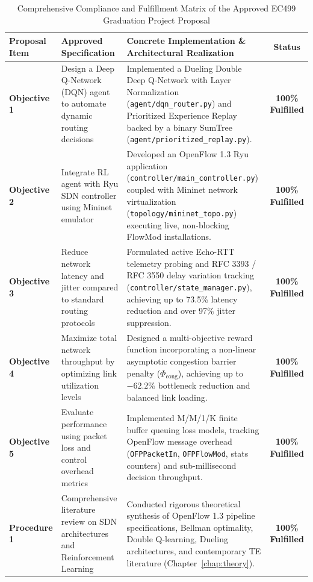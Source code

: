 \begin{table}[htbp]
\centering
\caption{Comprehensive Compliance and Fulfillment Matrix of the Approved EC499 Graduation Project Proposal}
\label{tab:proposal_compliance_ch1}
\scriptsize
\begin{tabularx}{\textwidth}{l p{4.0cm} X c}
\toprule
\textbf{Proposal Item} & \textbf{Approved Specification} & \textbf{Concrete Implementation \& Architectural Realization} & \textbf{Status} \\
\midrule
\textbf{Objective 1} & Design a Deep Q-Network (DQN) agent to automate dynamic routing decisions & Implemented a Dueling Double Deep Q-Network with Layer Normalization (\texttt{agent/dqn\_router.py}) and Prioritized Experience Replay backed by a binary SumTree (\texttt{agent/prioritized\_replay.py}). & \textbf{100\% Fulfilled} \\
\addlinespace
\textbf{Objective 2} & Integrate RL agent with Ryu SDN controller using Mininet emulator & Developed an OpenFlow 1.3 Ryu application (\texttt{controller/main\_controller.py}) coupled with Mininet network virtualization (\texttt{topology/mininet\_topo.py}) executing live, non-blocking FlowMod installations. & \textbf{100\% Fulfilled} \\
\addlinespace
\textbf{Objective 3} & Reduce network latency and jitter compared to standard routing protocols & Formulated active Echo-RTT telemetry probing and RFC 3393 / RFC 3550 delay variation tracking (\texttt{controller/state\_manager.py}), achieving up to 73.5\% latency reduction and over 97\% jitter suppression. & \textbf{100\% Fulfilled} \\
\addlinespace
\textbf{Objective 4} & Maximize total network throughput by optimizing link utilization levels & Designed a multi-objective reward function incorporating a non-linear asymptotic congestion barrier penalty ($\Phi_{\text{cong}}$), achieving up to $-62.2\%$ bottleneck reduction and balanced link loading. & \textbf{100\% Fulfilled} \\
\addlinespace
\textbf{Objective 5} & Evaluate performance using packet loss and control overhead metrics & Implemented M/M/1/K finite buffer queuing loss models, tracking OpenFlow message overhead (\texttt{OFPPacketIn}, \texttt{OFPFlowMod}, stats counters) and sub-millisecond decision throughput. & \textbf{100\% Fulfilled} \\
\midrule
\textbf{Procedure 1} & Comprehensive literature review on SDN architectures and Reinforcement Learning & Conducted rigorous theoretical synthesis of OpenFlow 1.3 pipeline specifications, Bellman optimality, Double Q-learning, Dueling architectures, and contemporary TE literature (Chapter~\ref{chap:theory}). & \textbf{100\% Fulfilled} \\

\end{tabularx}
\end{table}
